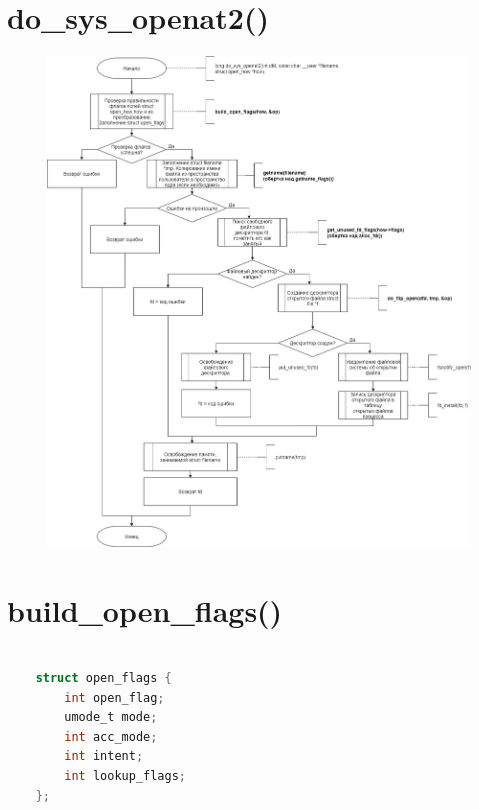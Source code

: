\documentclass[a4paper,14pt]{extreport}
\begin{document}
\section{do\_sys\_openat2()}
\begin{figure}[H]
	\centering
	\includegraphics[scale=0.4]{img/do_sys_openat2.jpg}
\end{figure}



\clearpage
\section{build\_open\_flags()}

\begin{lstlisting}[language=c, caption=Структура open\_flags]
	
	struct open_flags {
		int open_flag;
		umode_t mode;
		int acc_mode;
		int intent;
		int lookup_flags;
	};
\end{lstlisting}
\end{document}
